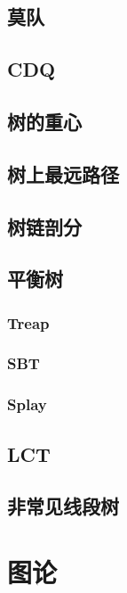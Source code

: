 \documentclass{article}
\begin{document}
\subsection{莫队}

\subsection{CDQ}

\subsection{树的重心}

\subsection{树上最远路径}

\subsection{树链剖分}

\subsection{平衡树}
\subsubsection{Treap}

\subsubsection{SBT}

\subsubsection{Splay}

\subsection{LCT}

\subsection{非常见线段树}


\section{图论}
\end{document}
